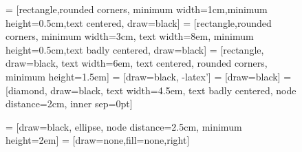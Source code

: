 \documentclass{article}
\newcommand{\1}{\mathds{1}}
\numberwithin{equation}{section}
\renewcommand{\cal}{\mathcal}
\theoremstyle{plain} %
\theoremstyle{remark}
\begin{document}
\begin{figure}
\color{black}
 = [rectangle,rounded corners, minimum width=1cm,minimum height=0.5cm,text centered, draw=black]
 = [rectangle,rounded corners, minimum width=3cm, text width=8em, minimum height=0.5cm,text badly centered, draw=black]
 = [rectangle, draw=black, %
    text width=6em, text centered, rounded corners, minimum height=1.5em]
 = [draw=black, -latex']
 = [draw=black]
 = [diamond, draw=black, %
    text width=4.5em, text badly centered, node distance=2cm, 
    inner sep=0pt]

 = [draw=black, ellipse, %
node distance=2.5cm,
    minimum height=2em]
 = [draw=none,fill=none,right]

\begin{center}  
\end{center}
\end{figure}
\end{document}
